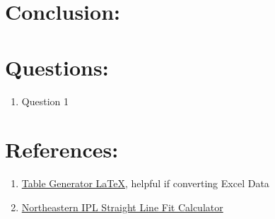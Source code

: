 \documentclass[12pt,a4paper]{article}
\begin{document}
		
	\section*{Conclusion:}
		
	\section*{Questions:}
		\begin{enumerate}
			\item Question 1
		\end{enumerate}
		
	\section*{References:}
		\begin{enumerate}
			\item \href{https://www.tablesgenerator.com/#}{Table Generator \LaTeX}, helpful if converting Excel Data
			\item \href{https://web.northeastern.edu/ipl/data-analysis/straight-line-fit/}{Northeastern IPL Straight Line Fit Calculator}
		\end{enumerate}
\end{document}
